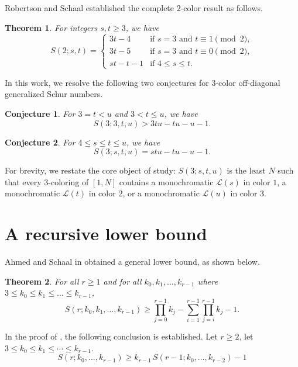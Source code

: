 \documentclass[twoside, 12pt]{article}
\newtheorem{theorem}{Theorem}
\newtheorem{conjecture}{Conjecture}
\begin{document}
Robertson and Schaal \cite{RobertsonSchaal01} established the complete $2$-color result as follows.


\begin{theorem}{\upshape \cite{RobertsonSchaal01}}\label{RobertsonSchaal01}
For integers $s,t \geq 3$, we have
$$
S(2;s,t) =
\begin{cases}
3t-4 & \text{if } s=3 \text{ and } t \equiv 1 \pmod{2}, \\
3t-5 & \text{if } s=3 \text{ and } t \equiv 0 \pmod{2}, \\
st - t - 1 & \text{if } 4 \leq s \leq t.
\end{cases}
$$
\end{theorem}


In this work, we resolve the following two conjectures for 3-color off-diagonal generalized Schur numbers.


\begin{conjecture}{\upshape \cite{AhSc16}}\label{conjecture-1}
For $3=t<u$ and $3<t \leq u$, we have
$$
S(3 ; 3, t, u)>3 t u-t u-u-1 .
$$
\end{conjecture}


\begin{conjecture}{\upshape \cite{AhSc16}}\label{conjecture-2}
For $4 \leq s \leq t \leq u$, we have
$$
S(3 ; s, t, u)=s t u-t u-u-1.
$$
\end{conjecture}

For brevity, we restate the core object of study: $S(3;s,t,u)$ is the least $N$ such that every 3-coloring of $[1,N]$ contains a monochromatic $\mathcal{L}(s)$ in color $1$, a monochromatic $\mathcal{L}(t)$ in color $2$, or a monochromatic $\mathcal{L}(u)$ in color $3$.




\section{A recursive lower bound}

Ahmed and Schaal in \cite{AhSc16} obtained a general lower bound, as shown below.


\begin{theorem}{\upshape \cite{AhSc16}}\label{AhSc16}
For all $r \geq 1$ and for all $k_0, k_1, \dots, k_{r-1}$ where $3 \leq k_0 \leq k_1 \leq \dots \leq k_{r-1}$,
\[
S(r; k_0, k_1, \dots, k_{r-1}) \geq \prod_{j=0}^{r-1} k_j - \sum_{i=1}^{r-1} \prod_{j=i}^{r-1} k_j - 1.
\]
\end{theorem}


In the proof of \cite[Theorem 2.11]{AhSc16}, the following conclusion is established.
Let $r\ge 2$, let $3\le k_0\le k_1\le \cdots \le k_{r-1}$.
\begin{equation}\label{eq_lower}
S(r;k_0,\dots,k_{r-1})\ge k_{r-1}\,S(r-1;k_0,\dots,k_{r-2})-1
\end{equation}
\end{document}
